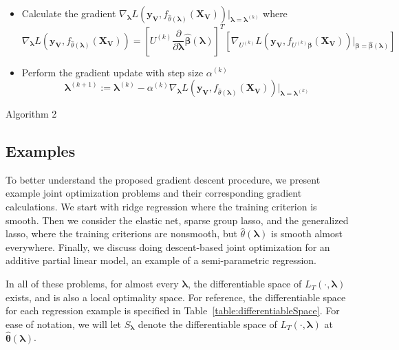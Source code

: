 \documentclass[10pt,letterpaper]{article}
\begin{document}
\begin{center}
{{\begin{itemize}
              \item[] Calculate the gradient $\nabla_{\boldsymbol{\lambda}} L(\boldsymbol{y_V}, f_{\hat \theta(\boldsymbol{\lambda})}(\boldsymbol{X_V})) |_{\boldsymbol{\lambda} = \boldsymbol{\lambda}^{(k)}}$ where
              	\begin{equation}
              	\nabla_{\boldsymbol{\lambda}} L(\boldsymbol{y_V}, f_{\hat \theta(\boldsymbol{\lambda})}(\boldsymbol{X_V})) =
		\left [
	  	U^{(k)}
		\frac{\partial}{\partial \boldsymbol \lambda} \hat{\boldsymbol \beta}(\boldsymbol{\lambda})
		\right ]^T
		\left [
		\nabla_{U^{(k)}} L(\boldsymbol{y_V}, f_{U^{(k)}\boldsymbol \beta}(\boldsymbol{X_V}))
               	\big |_{\boldsymbol \beta = \hat{\boldsymbol \beta}(\boldsymbol \lambda)}
		\right ]
	     	\label{gradientCalculation}
              	\end{equation}
              
              \item[] Perform the gradient update with step size $\alpha^{(k)}$
	\begin{equation*}
	\boldsymbol{\lambda}^{(k+1)} := \boldsymbol{\lambda}^{(k)} - \alpha^{(k)} \nabla_{\boldsymbol{\lambda}} L(\boldsymbol{y_V}, f_{\hat \theta(\boldsymbol{\lambda})}(\boldsymbol{X_V})) |_{\boldsymbol{\lambda} = \boldsymbol{\lambda}^{(k)}}
	\end{equation*}
         \end{itemize}
    }
  }
  Algorithm 2
\end{center}

\subsection{Examples}

To better understand the proposed gradient descent procedure, we present example joint optimization problems and their corresponding gradient calculations. We start with ridge regression where the training criterion is smooth. Then we consider the elastic net, sparse group lasso, and the generalized lasso, where the training criterions are nonsmooth, but $\hat{\theta}(\boldsymbol\lambda)$ is smooth almost everywhere. Finally, we discuss doing descent-based joint optimization for an additive partial linear model, an example of a semi-parametric regression.

In all of these problems, for almost every $\boldsymbol{\lambda}$, the differentiable space of $L_T(\cdot, \boldsymbol{\lambda})$ exists, and is also a local optimality space. For reference, the differentiable space for each regression example is specified in Table~\ref{table:differentiableSpace}. For ease of notation, we will let $S_{\boldsymbol{\lambda}}$ denote the differentiable space of $L_T(\cdot, \boldsymbol{\lambda})$ at $\hat{\boldsymbol{\theta}}(\boldsymbol{\lambda})$.
\end{document}
